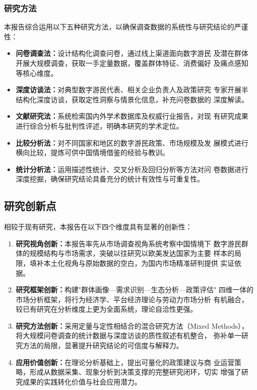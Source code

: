 \documentclass[12pt,a4paper]{article}
\begin{document}
\subsubsection{研究方法}

本报告综合运用以下五种研究方法，以确保调查数据的系统性与研究结论的严谨性：

\begin{itemize}
  \item \textbf{问卷调查法：}设计结构化调查问卷，通过线上渠道面向数字游民
        及潜在群体开展大规模调查，获取一手定量数据，覆盖群体特征、消费偏好
        及痛点感知等核心维度。

  \item \textbf{深度访谈法：}对典型数字游民代表、相关企业负责人及政策研究
        专家开展半结构化深度访谈，获取定性洞察与情景化信息，补充问卷数据的
        深度解读。

  \item \textbf{文献研究法：}系统检索国内外学术数据库及权威行业报告，对现
        有研究成果进行综合分析与批判性评述，明确本研究的学术定位。

  \item \textbf{比较分析法：}对不同国家和地区的数字游民政策、市场规模及发
        展模式进行横向比较，提炼可供中国情境借鉴的经验与教训。

  \item \textbf{统计分析法：}运用描述性统计、交叉分析及回归分析等方法对问
        卷数据进行深度挖掘，确保研究结论具备充分的统计有效性与可重复性。
\end{itemize}

\subsection{研究创新点}

相较于现有研究，本报告在以下四个维度具有显著的创新性：

\begin{enumerate}[label=\arabic*.]
  \item \textbf{研究视角创新：}本报告率先从市场调查视角系统考察中国情境下
        数字游民群体的规模结构与市场需求，突破以往研究以欧美发达国家为主要
        样本的局限，填补本土化视角与原始数据的空白，为国内市场精准研判提供
        实证依据。

  \item \textbf{研究框架创新：}构建"群体画像—需求识别—生态分析—政策评估"
        四维一体的市场分析框架，将行为经济学、平台经济理论与劳动力市场分析
        有机融合，较已有研究在分析维度上更为全面系统，理论自洽性更强。

  \item \textbf{研究方法创新：}采用定量与定性相结合的混合研究方法（Mixed
        Methods），将大规模问卷调查的统计数据与深度访谈的质性叙述有机整合，
        弥补单一研究方法的局限，显著提升研究结论的可信度与解释力。

  \item \textbf{应用价值创新：}在理论分析基础上，提出可量化的政策建议与商
        业运营策略，形成从数据采集、现象分析到决策支撑的完整研究闭环，切实
        增强了研究成果的实践转化价值与社会应用潜力。
\end{enumerate}
\end{document}
